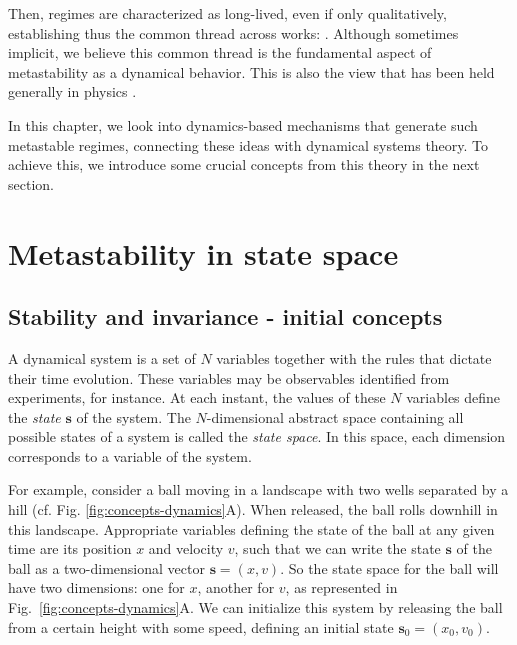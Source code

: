 Then, regimes are characterized as long-lived, even if only qualitatively, establishing thus the common thread across works: . Although sometimes implicit, we believe this common thread is the fundamental aspect of metastability as a dynamical behavior. This is also the view that has been held generally in physics \cite{olivieri2005large, callen1991thermodynamics}.

In this chapter, we look into dynamics-based mechanisms that generate such metastable regimes, connecting these ideas with dynamical systems theory. To achieve this, we introduce some crucial concepts from this theory in the next section. 


\section{Metastability in state space}\label{sec:nonlinear}

\subsection{Stability and invariance - initial concepts}\label{sec:stability_and_invariance}

A dynamical system is a set of $N$ variables together with the rules that dictate their time evolution. These variables may be observables identified from experiments, for instance. At each instant, the values of these $N$ variables define the \textit{state} $\mathbf{s}$ of the system. The $N$-dimensional abstract space containing all possible states of a system is called the \textit{state space}. In this space, each dimension corresponds to a variable of the system. 

For example, consider a ball moving in a landscape with two wells separated by a hill (cf. Fig. \ref{fig:concepts-dynamics}A). When released, the ball rolls downhill in this landscape. Appropriate variables defining the state of the ball at any given time are its position $x$ and velocity $v$, such that we can write the state $\textbf{s}$ of the ball as a two-dimensional vector $\mathbf{s} = (x,v)$. So the state space for the ball will have two dimensions: one for $x$, another for $v$, as represented in Fig.~\ref{fig:concepts-dynamics}A\supprime. We can initialize this system by releasing the ball from a certain height with some speed, defining an initial state $\mathbf{s}_0 = (x_0, v_0)$. 

